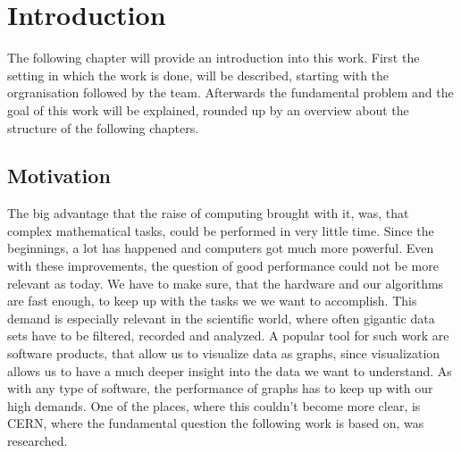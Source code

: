 
\chapter{Introduction}
\label{ch:Introduction}

The following chapter will provide an introduction into this work. First the setting in which the work is done, will be described, starting with the orgranisation followed by the team. Afterwards the fundamental problem and the goal of this work will be explained, rounded up by an overview about the structure of the following chapters.





\section{Motivation}
\label{sec:Introduction:Motivation}

The big advantage that the raise of computing brought with it, was, that complex mathematical tasks, could be performed in very little time. Since the beginnings, a lot has happened and computers got much more powerful. Even with these improvements, the question of good performance could not be more relevant as today. We have to make sure, that the hardware and our algorithms are fast enough, to keep up with the tasks we we want to accomplish. This demand is especially relevant in the scientific world, where often gigantic data sets have to be filtered, recorded and analyzed. A popular tool for such work are software products, that allow us to visualize data as graphs, since visualization allows us to have a much deeper insight into the data we want to understand. As with any type of software, the performance of graphs has to keep up with our high demands. One of the places, where this couldn't become more clear, is CERN, where the fundamental question the following work is based on, was researched.





